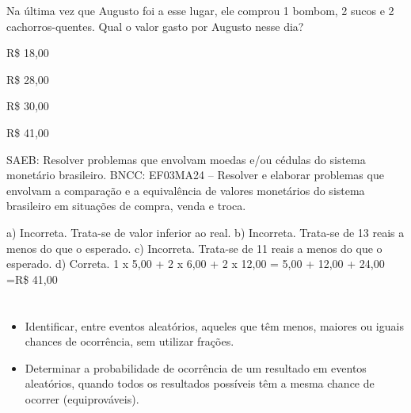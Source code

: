 \begin{escolha}
{\begin{escolha}
Na última vez que Augusto foi a esse lugar, ele comprou 1 bombom, 2
sucos e 2 cachorros-quentes. Qual o valor gasto por Augusto nesse dia?

\begin{escolha}

\item
  R\$ 18,00
\item
  R\$ 28,00
\item
  R\$ 30,00
\item
  R\$ 41,00
\end{escolha}

SAEB: Resolver problemas que envolvam moedas e/ou cédulas do sistema monetário brasileiro. 
BNCC: EF03MA24 -- Resolver e elaborar problemas que envolvam a comparação e a equivalência de
valores monetários do sistema brasileiro em situações de compra, venda e troca.

a) Incorreta. Trata-se de valor inferior ao real.
b) Incorreta. Trata-se de 13 reais a menos do que o esperado.
c) Incorreta. Trata-se de 11 reais a menos do que o esperado.
d) Correta.
1 x 5,00 + 2 x 6,00 + 2 x 12,00 = 5,00 + 12,00 + 24,00 =R\$ 41,00


\chapter{}


\begin{itemize}
    \item Identificar, entre eventos aleatórios, aqueles que têm menos, maiores ou
iguais chances de ocorrência, sem utilizar frações.

    \item Determinar a probabilidade de ocorrência de um resultado em eventos
aleatórios, quando todos os resultados possíveis têm a mesma chance de
ocorrer (equiprováveis).
\end{itemize}




\end{escolha}}
\end{escolha}
